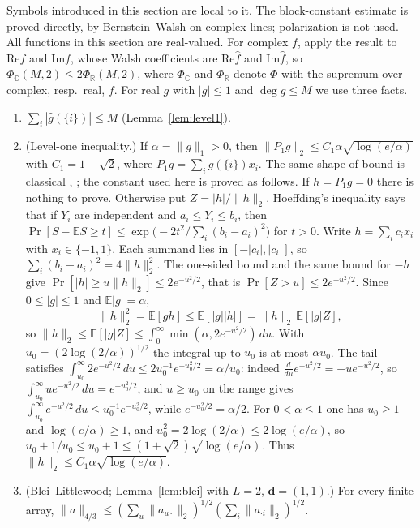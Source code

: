 \documentclass[11pt]{amsart}
\theoremstyle{definition}
\newcommand{\R}{\mathbb{R}}
\newcommand{\C}{\mathbb{C}}
\newcommand{\E}{\mathbb{E}}
\newcommand{\hf}{\widehat f}
\newcommand{\bd}{\mathbf d}
\begin{document}
Symbols introduced in this section are local to it. The block-constant estimate is proved directly, by Bernstein--Walsh on complex lines; polarization is not used. All functions in this section are real-valued. For complex $f$, apply the result to $\mathrm{Re}f$ and $\mathrm{Im}f$, whose Walsh coefficients are $\mathrm{Re}\hf$ and $\mathrm{Im}\hf$, so $\Phi_\C(M,2)\le2\Phi_\R(M,2)$, where $\Phi_\C$ and $\Phi_\R$ denote $\Phi$ with the supremum over complex, resp.\ real, $f$. For real $g$ with $|g|\le1$ and $\deg g\le M$ we use three facts.
\begin{enumerate}[label=(\alph*),leftmargin=*]
\item $\sum_i|\hat g(\{i\})|\le M$ (Lemma~\ref{lem:level1}).
\item (Level-one inequality.) If $\alpha=\|g\|_1>0$, then $\|P_1g\|_2\le C_1\alpha\sqrt{\log(e/\alpha)}$ with $C_1=1+\sqrt2$, where $P_1g=\sum_i\hat g(\{i\})x_i$. The same shape of bound is classical \cite{Tal96,Cha02}, \cite[Sec.~5.4]{OD}; the constant used here is proved as follows. If $h=P_1g=0$ there is nothing to prove. Otherwise put $Z=|h|/\|h\|_2$. Hoeffding's inequality \cite[Theorem~2]{Hoe63} says that if $Y_i$ are independent and $a_i\le Y_i\le b_i$, then $\Pr[S-\E S\ge t]\le\exp\bigl(-2t^2/\sum_i(b_i-a_i)^2\bigr)$ for $t>0$. Write $h=\sum_ic_ix_i$ with $x_i\in\{-1,1\}$. Each summand lies in $[-|c_i|,|c_i|]$, so $\sum_i(b_i-a_i)^2=4\|h\|_2^2$. The one-sided bound and the same bound for $-h$ give $\Pr[|h|\ge u\|h\|_2]\le2e^{-u^2/2}$, that is $\Pr[Z>u]\le2e^{-u^2/2}$. Since $0\le|g|\le1$ and $\E|g|=\alpha$,
\[
\|h\|_2^2=\E[gh]\le\E[|g||h|]=\|h\|_2\,\E[|g|Z],
\]
so $\|h\|_2\le\E[|g|Z]\le\int_0^\infty\min(\alpha,2e^{-u^2/2})\,du$. With $u_0=(2\log(2/\alpha))^{1/2}$ the integral up to $u_0$ is at most $\alpha u_0$. The tail satisfies $\int_{u_0}^\infty 2e^{-u^2/2}\,du\le 2u_0^{-1}e^{-u_0^2/2}=\alpha/u_0$: indeed $\frac{d}{du}e^{-u^2/2}=-ue^{-u^2/2}$, so $\int_{u_0}^\infty ue^{-u^2/2}\,du=e^{-u_0^2/2}$, and $u\ge u_0$ on the range gives $\int_{u_0}^\infty e^{-u^2/2}\,du\le u_0^{-1}e^{-u_0^2/2}$, while $e^{-u_0^2/2}=\alpha/2$. For $0<\alpha\le1$ one has $u_0\ge1$ and $\log(e/\alpha)\ge1$, and $u_0^2=2\log(2/\alpha)\le2\log(e/\alpha)$, so $u_0+1/u_0\le u_0+1\le(1+\sqrt2)\sqrt{\log(e/\alpha)}$. Thus $\|h\|_2\le C_1\alpha\sqrt{\log(e/\alpha)}$.
\item (Blei--Littlewood; Lemma~\ref{lem:blei} with $L=2$, $\bd=(1,1)$.) For every finite array, $\|a\|_{4/3}\le(\sum_u\|a_{u\cdot}\|_2)^{1/2}(\sum_i\|a_{\cdot i}\|_2)^{1/2}$.
\end{enumerate}
\end{document}
